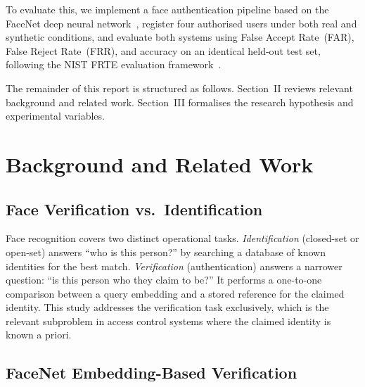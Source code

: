 \documentclass[conference]{IEEEtran}
\begin{document}
To evaluate this, we implement a face authentication pipeline
based on the FaceNet deep neural network~\cite{schroff2015},
register four authorised users under both real and synthetic
conditions, and evaluate both systems using False Accept
Rate~(FAR), False Reject Rate~(FRR), and accuracy on an
identical held-out test set, following the NIST FRTE
evaluation framework~\cite{nist2024}.

The remainder of this report is structured as follows.
Section~II reviews relevant background and related work.
Section~III formalises the research hypothesis and
experimental variables.

\section{Background and Related Work}

\subsection{Face Verification vs.\ Identification}

Face recognition covers two distinct operational tasks.
\textit{Identification} (closed-set or open-set) answers ``who
is this person?'' by searching a database of known identities
for the best match. \textit{Verification} (authentication)
answers a narrower question: ``is this person who they claim
to be?'' It performs a one-to-one comparison between a query
embedding and a stored reference for the claimed identity.
This study addresses the verification task exclusively, which
is the relevant subproblem in access control systems where the
claimed identity is known a priori.

\subsection{FaceNet Embedding-Based Verification}
\end{document}
